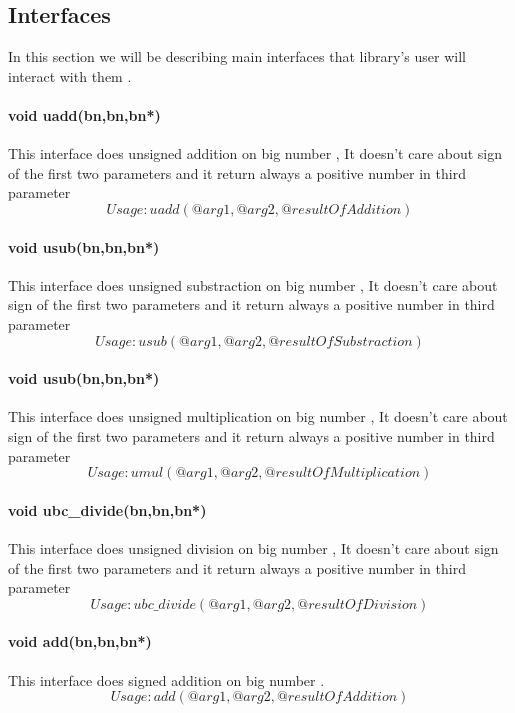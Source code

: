 \newpage
\subsection{Interfaces}
In this section we will be describing main interfaces that library's user will interact with them .

\paragraph{void uadd(bn,bn,bn*)} This interface does unsigned addition on big number , It doesn't care about sign of the first two parameters and it return always a positive number in third parameter
$$Usage : uadd(@arg1,@arg2,@resultOfAddition)  $$ 


\paragraph{void usub(bn,bn,bn*)} This interface does unsigned substraction on big number , It doesn't care about sign of the first two parameters and it return always a positive number in third parameter
$$Usage : usub(@arg1,@arg2,@resultOfSubstraction)  $$ 


\paragraph{void usub(bn,bn,bn*)} This interface does unsigned multiplication on big number , It doesn't care about sign of the first two parameters and it return always a positive number in third parameter
$$Usage : umul(@arg1,@arg2,@resultOfMultiplication)  $$ 


\paragraph{void ubc\_divide(bn,bn,bn*)} This interface does unsigned division on big number , It doesn't care about sign of the first two parameters and it return always a positive number in third parameter
$$Usage : ubc\_divide(@arg1,@arg2,@resultOfDivision)  $$ 





\paragraph{void add(bn,bn,bn*)} This interface does signed addition on big number .
$$Usage : add(@arg1,@arg2,@resultOfAddition)  $$ 

